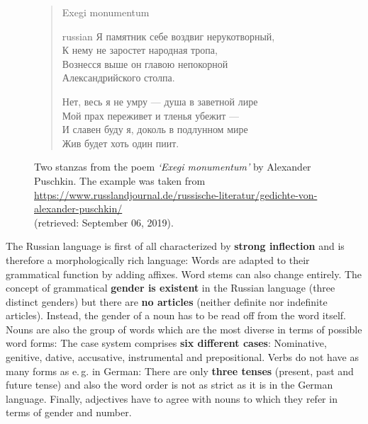 \begin{figure}[h]
	\begin{verse}
		{\Large Exegi monumentum} \\
		\bigskip
		\begin{otherlanguage*}{russian}
			Я памятник себе воздвиг нерукотворный,		\\
			К нему не заростет народная тропа, 			\\
			Вознесся выше он главою непокорной 		\\
			Александрийского столпа. 			

			\medskip

			Нет, весь я не умру — душа в заветной лире	\\
			Мой прах переживет и тленья убежит — 		\\
			И славен буду я, доколь в подлунном мире 	\\
			Жив будет хоть один пиит.
		\end{otherlanguage*}
	\end{verse}
	\caption[Two stanzas from the poem \textit{`Exegi monumentum'} by Alexander Puschkin]
		{Two stanzas from the poem \textit{`Exegi monumentum'} by Alexander Puschkin. The example was taken from \\
		\url{https://www.russlandjournal.de/russische-literatur/gedichte-von-alexander-puschkin/} \\
		(retrieved: September 06, 2019).}
	\label{fig:cyrillic}
\end{figure}

The Russian language is first of all characterized by \textbf{strong inflection} and is therefore a morphologically rich language: Words are adapted to their grammatical function by adding affixes. Word stems can also change entirely. The concept of grammatical \textbf{gender is existent} in the Russian language (three distinct genders) but there are \textbf{no articles} (neither definite nor indefinite articles). Instead, the gender of a noun has to be read off from the word itself. Nouns are also the group of words which are the most diverse in terms of possible word forms: The case system comprises \textbf{six different cases}:  Nominative,  genitive,  dative,  accusative,  instrumental and  prepositional. Verbs do not have as many forms as e.\,g. in German: There are only \textbf{three tenses} (present, past and future tense) and also the word order is not as strict as it is in the German language. Finally, adjectives have to agree with nouns to which they refer in terms of gender and number.

